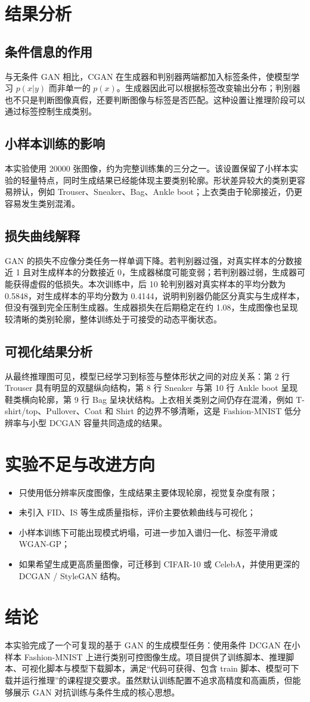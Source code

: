 \documentclass[a4paper,10pt,twocolumn]{article}
\begin{document}
\section{结果分析}
\subsection{条件信息的作用}
与无条件 GAN 相比，CGAN 在生成器和判别器两端都加入标签条件，使模型学习 $p(x|y)$ 而非单一的 $p(x)$。生成器因此可以根据标签改变输出分布；判别器也不只是判断图像真假，还要判断图像与标签是否匹配。这种设置让推理阶段可以通过标签控制生成类别。

\subsection{小样本训练的影响}
本实验使用 20000 张图像，约为完整训练集的三分之一。该设置保留了小样本实验的轻量特点，同时生成结果已经能体现主要类别轮廓。形状差异较大的类别更容易辨认，例如 Trouser、Sneaker、Bag、Ankle boot；上衣类由于轮廓接近，仍更容易发生类别混淆。

\subsection{损失曲线解释}
GAN 的损失不应像分类任务一样单调下降。若判别器过强，对真实样本的分数接近 1 且对生成样本的分数接近 0，生成器梯度可能变弱；若判别器过弱，生成器可能获得虚假的低损失。本次训练中，后 10 轮判别器对真实样本的平均分数为 0.5848，对生成样本的平均分数为 0.4144，说明判别器仍能区分真实与生成样本，但没有强到完全压制生成器。生成器损失在后期稳定在约 1.08，生成图像也呈现较清晰的类别轮廓，整体训练处于可接受的动态平衡状态。

\subsection{可视化结果分析}
从最终推理图可见，模型已经学习到标签与整体形状之间的对应关系：第 2 行 Trouser 具有明显的双腿纵向结构，第 8 行 Sneaker 与第 10 行 Ankle boot 呈现鞋类横向轮廓，第 9 行 Bag 呈块状结构。上衣相关类别之间仍存在混淆，例如 T-shirt/top、Pullover、Coat 和 Shirt 的边界不够清晰，这是 Fashion-MNIST 低分辨率与小型 DCGAN 容量共同造成的结果。

\section{实验不足与改进方向}
\begin{itemize}
  \item 只使用低分辨率灰度图像，生成结果主要体现轮廓，视觉复杂度有限；
  \item 未引入 FID、IS 等生成质量指标，评价主要依赖曲线与可视化；
  \item 小样本训练下可能出现模式坍塌，可进一步加入谱归一化、标签平滑或 WGAN-GP；
  \item 如果希望生成更高质量图像，可迁移到 CIFAR-10 或 CelebA，并使用更深的 DCGAN / StyleGAN 结构。
\end{itemize}

\section{结论}
本实验完成了一个可复现的基于 GAN 的生成模型任务：使用条件 DCGAN 在小样本 Fashion-MNIST 上进行类别可控图像生成。项目提供了训练脚本、推理脚本、可视化脚本与模型下载脚本，满足“代码可获得、包含 train 脚本、模型可下载并运行推理”的课程提交要求。虽然默认训练配置不追求高精度和高画质，但能够展示 GAN 对抗训练与条件生成的核心思想。
\end{document}
